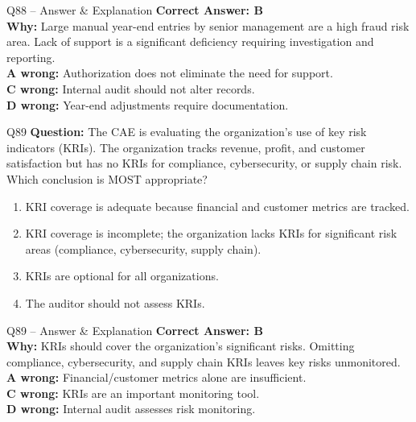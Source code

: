 \documentclass[aspectratio=169,10pt]{beamer}
\begin{document}
	\begin{frame}[t]{Q88 -- Answer \& Explanation}
		\small
		\textbf{Correct Answer: B} \\[4pt]
		\textbf{Why:} Large manual year-end entries by senior management are a high fraud risk area. Lack of support is a significant deficiency requiring investigation and reporting. \\[4pt]
		\textbf{A wrong:} Authorization does not eliminate the need for support. \\[2pt]
		\textbf{C wrong:} Internal audit should not alter records. \\[2pt]
		\textbf{D wrong:} Year-end adjustments require documentation.
	\end{frame}
	
	\begin{frame}[t]{Q89}
		\small
		\textbf{Question:} The CAE is evaluating the organization's use of key risk indicators (KRIs). The organization tracks revenue, profit, and customer satisfaction but has no KRIs for compliance, cybersecurity, or supply chain risk. Which conclusion is MOST appropriate?
		\begin{enumerate}[label=\Alph*.,itemsep=1pt,topsep=2pt]
			\item KRI coverage is adequate because financial and customer metrics are tracked.
			\item KRI coverage is incomplete; the organization lacks KRIs for significant risk areas (compliance, cybersecurity, supply chain).
			\item KRIs are optional for all organizations.
			\item The auditor should not assess KRIs.
		\end{enumerate}
	\end{frame}
	
	\begin{frame}[t]{Q89 -- Answer \& Explanation}
		\small
		\textbf{Correct Answer: B} \\[4pt]
		\textbf{Why:} KRIs should cover the organization's significant risks. Omitting compliance, cybersecurity, and supply chain KRIs leaves key risks unmonitored. \\[4pt]
		\textbf{A wrong:} Financial/customer metrics alone are insufficient. \\[2pt]
		\textbf{C wrong:} KRIs are an important monitoring tool. \\[2pt]
		\textbf{D wrong:} Internal audit assesses risk monitoring.
	\end{frame}
	
\end{document}
